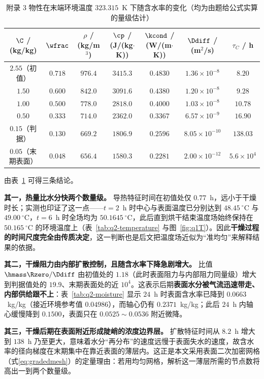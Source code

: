 \begin{table}[!ht]
  \centering
  \caption{附录 3 物性在末端环境温度 $323.315$~K 下随含水率的变化（均为由题给公式实算的量级估计）}
  \label{tab:scale}
  \scriptsize
  \begin{tabular}{ccccccc}
    \toprule
    $\C$ / (kg/kg) & $\wfrac$ & $\rho$ / (kg/m$^3$) & $\cp$ / (J/(kg$\cdot$K))
      & $\kcond$ / (W/(m$\cdot$K)) & $\Ddiff$ / (m$^2$/s)
      & $\tau_C$ / h \\
    \midrule
    $2.55$（初值） & $0.718$ & $976.4$ & $3415.3$ & $0.4830$ & $1.36\times10^{-8}$ & $8.20$ \\
    $1.50$ & $0.600$ & $842.0$ & $3091.6$ & $0.4380$ & $1.20\times10^{-8}$ & $9.28$ \\
    $1.00$ & $0.500$ & $778.0$ & $2818.0$ & $0.4000$ & $1.03\times10^{-8}$ & $10.78$ \\
    $0.50$ & $0.333$ & $714.0$ & $2362.0$ & $0.3367$ & $6.57\times10^{-9}$ & $16.90$ \\
    $0.15$（判据） & $0.130$ & $669.2$ & $1806.9$ & $0.2596$ & $8.05\times10^{-10}$ & $138.03$ \\
    $0.05$（末期表面） & $0.048$ & $656.4$ & $1580.3$ & $0.2281$ & $2.00\times10^{-12}$ & $5.6\times10^{4}$ \\
    \bottomrule
  \end{tabular}
\end{table}

由表~\ref{tab:scale} 可得三条结论。

\textbf{其一，热量比水分快两个数量级。} 导热特征时间在初值处仅 $0.77$~h，远小于干燥时长；实测也印证了这一点——$t=2$~h 时中心与表面温度已分别达到 $48.45~^\circ$C 与 $49.00~^\circ$C，$t=6$~h 时全场均为 $50.1645~^\circ$C，此后直到烘干结束温度场始终保持在 $50.165~^\circ$C 的环境温度上（表~\ref{tab:q2-temperature} 与图~\ref{fig:q1T}）。因此\textbf{干燥过程的时间尺度完全由传质决定}，这一判断也是后文把温度场近似为``准均匀''来解释结果的依据。

\textbf{其二，干燥阻力由内部扩散控制，且随含水率下降急剧增大。} 比值 $\hmass\Rzero/\Ddiff$ 由初值处的 $1.18$（此时表面阻力与内部阻力同量级）增大到判据值处的 $19.9$、末期表面处的近 $10^4$。这表示后期\textbf{表面水分被气流迅速带走、内部供给跟不上}：表~\ref{tab:q2-moisture} 显示 $24$~h 时表面含水率已降到 $0.0663$~kg/kg（接近环境参考值 $0.04986$），而轴心仍有 $0.2371$~kg/kg；此后 $24$~h 内轴心缓慢降到 $0.1500$，表面只在 $0.0525\sim0.0536$ 附近微降。

\textbf{其三，干燥后期在表面附近形成陡峭的浓度边界层。} 扩散特征时间从 $8.2$~h 增大到 $138$~h 乃至更大，意味着水分``再分布''的速度远慢于表面失水的速度，故含水率的径向梯度在末期集中在靠近表面的薄层内。这正是本文采用表面二次加密网格（式\eqref{eq:gradedmesh}）的定量理由：若用均匀网格，解析这一薄层所需的节点数将高出一到两个数量级。

